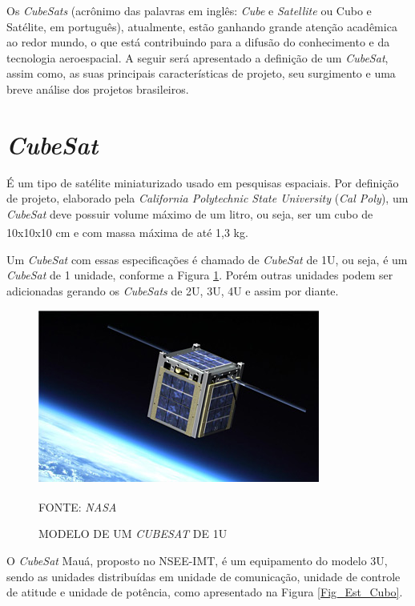 \documentclass[
	12pt,				%
	openright,			%
	oneside,			%
	a4paper,			%
	english,			%
	french,				%
	spanish,			%
	brazil,				%
	oldfontcommands
	]{abntex2}
\begin{document}
	Os \textit{CubeSats} (acrônimo das palavras em inglês: \textit{Cube} e \textit{Satellite} ou Cubo e Satélite, em português), atualmente, estão ganhando grande atenção acadêmica ao redor mundo, o que está contribuindo para a difusão do conhecimento e da tecnologia aeroespacial. A seguir será apresentado a definição de um \textit{CubeSat}, assim como, as suas principais características de projeto, seu surgimento e uma breve análise dos projetos brasileiros. 

\section[CubeSat]{\textit{CubeSat}}

	É um tipo de satélite miniaturizado usado em pesquisas espaciais. Por definição de projeto, elaborado pela \textit{California Polytechnic State University} (\textit{Cal Poly}), um \textit{CubeSat} deve possuir volume máximo de um litro, ou seja, ser um cubo de 10x10x10 cm e com massa máxima de até 1,3 kg.\textsuperscript{\cite{CubeSat}}
	
	Um \textit{CubeSat} com essas especificações é chamado de \textit{CubeSat} de 1U, ou seja, é um \textit{CubeSat} de 1 unidade, conforme a Figura \ref{Fig_Cubo}. Porém outras unidades podem ser adicionadas gerando os \textit{CubeSats} de 2U, 3U, 4U e assim por diante.
	
	\begin{figure}[th]
		\caption{MODELO DE UM \textit{CUBESAT} DE 1U}
		\label{Fig_Cubo}
		\centering
		\includegraphics[width=0.8\linewidth]{./figs/cubesat_01}
			
		\begin{small}
			FONTE: \textit{NASA}\textsuperscript{\cite{NASA}}
		\end{small}		
	\end{figure}
		
	O \textit{CubeSat} Mauá, proposto no NSEE-IMT, é um equipamento do modelo 3U, sendo as unidades distribuídas em unidade de comunicação, unidade de controle de atitude e unidade de potência, como apresentado na Figura \ref{Fig_Est_Cubo}.
	
\end{document}
